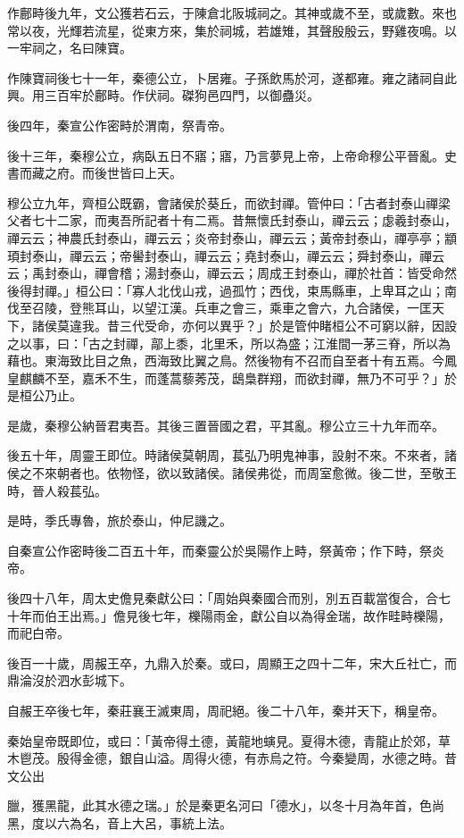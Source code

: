 \begin{pinyinscope}
作鄜畤後九年，文公獲若石云，于陳倉北阪城祠之。其神或歲不至，或歲數。來也常以夜，光輝若流星，從東方來，集於祠城，若雄雉，其聲殷殷云，野雞夜鳴。以一牢祠之，名曰陳寶。

作陳寶祠後七十一年，秦德公立，卜居雍。子孫飲馬於河，遂都雍。雍之諸祠自此興。用三百牢於鄜畤。作伏祠。磔狗邑四門，以御蠱災。

後四年，秦宣公作密畤於渭南，祭青帝。

後十三年，秦穆公立，病臥五日不寤；寤，乃言夢見上帝，上帝命穆公平晉亂。史書而藏之府。而後世皆曰上天。

穆公立九年，齊桓公既霸，會諸侯於葵丘，而欲封禪。管仲曰：「古者封泰山禪梁父者七十二家，而夷吾所記者十有二焉。昔無懷氏封泰山，禪云云；虙羲封泰山，禪云云；神農氏封泰山，禪云云；炎帝封泰山，禪云云；黃帝封泰山，禪亭亭；顓頊封泰山，禪云云；帝嚳封泰山，禪云云；堯封泰山，禪云云；舜封泰山，禪云云；禹封泰山，禪會稽；湯封泰山，禪云云；周成王封泰山，禪於社首：皆受命然後得封禪。」桓公曰：「寡人北伐山戎，過孤竹；西伐，束馬縣車，上卑耳之山；南伐至召陵，登熊耳山，以望江漢。兵車之會三，乘車之會六，九合諸侯，一匡天下，諸侯莫違我。昔三代受命，亦何以異乎？」於是管仲睹桓公不可窮以辭，因設之以事，曰：「古之封禪，鄗上黍，北里禾，所以為盛；江淮間一茅三脊，所以為藉也。東海致比目之魚，西海致比翼之鳥。然後物有不召而自至者十有五焉。今鳳皇麒麟不至，嘉禾不生，而蓬蒿藜莠茂，鴟梟群翔，而欲封禪，無乃不可乎？」於是桓公乃止。

是歲，秦穆公納晉君夷吾。其後三置晉國之君，平其亂。穆公立三十九年而卒。

後五十年，周靈王即位。時諸侯莫朝周，萇弘乃明鬼神事，設射不來。不來者，諸侯之不來朝者也。依物怪，欲以致諸侯。諸侯弗從，而周室愈微。後二世，至敬王時，晉人殺萇弘。

是時，季氏專魯，旅於泰山，仲尼譏之。

自秦宣公作密畤後二百五十年，而秦靈公於吳陽作上畤，祭黃帝；作下畤，祭炎帝。

後四十八年，周太史儋見秦獻公曰：「周始與秦國合而別，別五百載當復合，合七十年而伯王出焉。」儋見後七年，櫟陽雨金，獻公自以為得金瑞，故作畦畤櫟陽，而祀白帝。

後百一十歲，周赧王卒，九鼎入於秦。或曰，周顯王之四十二年，宋大丘社亡，而鼎淪沒於泗水彭城下。

自赧王卒後七年，秦莊襄王滅東周，周祀絕。後二十八年，秦并天下，稱皇帝。

秦始皇帝既即位，或曰：「黃帝得土德，黃龍地螾見。夏得木德，青龍止於郊，草木鬯茂。殷得金德，銀自山溢。周得火德，有赤烏之符。今秦變周，水德之時。昔文公出

臘，獲黑龍，此其水德之瑞。」於是秦更名河曰「德水」，以冬十月為年首，色尚黑，度以六為名，音上大呂，事統上法。


\end{pinyinscope}
